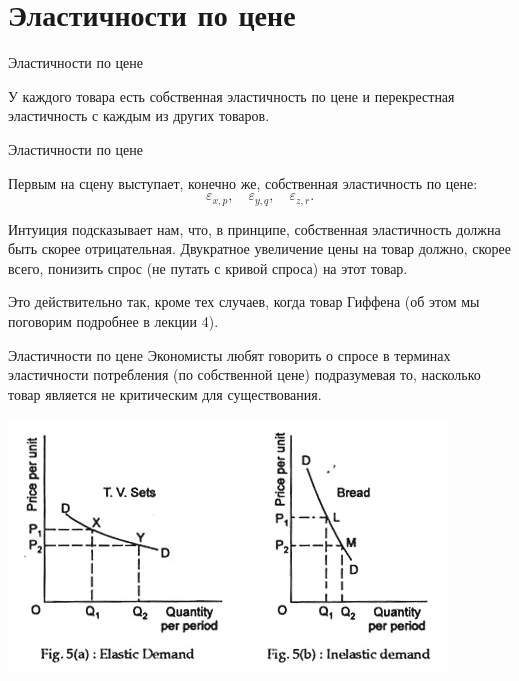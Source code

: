 \documentclass{beamer}
\begin{document}
\section{Эластичности по цене}

\begin{frame}{Эластичности по цене}

У каждого товара есть \alert{собственная эластичность} по цене и \alert{перекрестная эластичность} с каждым из других товаров. 

\end{frame}

\begin{frame}{Эластичности по цене}

Первым на сцену выступает, конечно же, собственная эластичность по цене:
$$\varepsilon_{x,p}, \quad \varepsilon_{y,q}, \quad \varepsilon_{z,r}.$$

Интуиция подсказывает нам, что, в принципе, собственная эластичность должна быть скорее отрицательная. Двукратное увеличение цены на товар должно, скорее всего, понизить спрос (не путать с кривой спроса) на этот товар. 

Это действительно так, кроме тех случаев, когда товар Гиффена (об этом мы поговорим подробнее в лекции 4).

\end{frame}


\begin{frame}{Эластичности по цене}
Экономисты любят говорить о спросе в терминах эластичности потребления (по собственной цене) подразумевая то, насколько товар является не критическим для существования.
\begin{center}
     \includegraphics[width=.9\textwidth]{elast}
     \end{center}
\end{frame}
\end{document}
